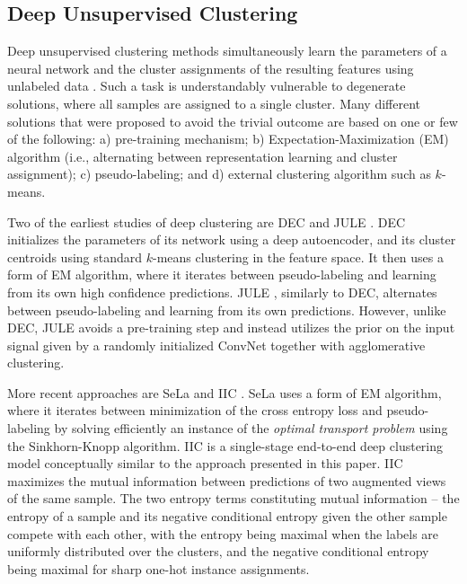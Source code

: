 \documentclass[runningheads]{llncs}
\begin{document}
\subsection{Deep Unsupervised Clustering}
\label{section:deep_unsupervised_clustering}
Deep unsupervised clustering methods simultaneously learn the parameters of a neural network and the cluster assignments of the resulting features using unlabeled data \cite{xie2016unsupervised,yang2016joint,chang2017deep,caron2018deep,haeusser2018associative,ji2019invariant,van2020scan,YM.2020Self-labelling}. Such a task is understandably vulnerable to degenerate solutions, where all samples are assigned to a single cluster. Many different solutions that were proposed to avoid the trivial outcome are based on one or few of the following: a) pre-training mechanism; b) Expectation-Maximization (EM) algorithm (i.e., alternating between representation learning and cluster assignment); c) pseudo-labeling; and d) external clustering algorithm such as $k$-means. 

Two of the earliest studies of deep clustering are DEC \cite{xie2016unsupervised} and JULE \cite{yang2016joint}. DEC \cite{xie2016unsupervised} initializes the parameters of its network using a deep autoencoder, and its cluster centroids using standard $k$-means clustering in the feature space. It then uses a form of EM algorithm, where it iterates between pseudo-labeling and learning from its own high confidence predictions. JULE \cite{xie2016unsupervised}, similarly to DEC, alternates between pseudo-labeling and learning from its own predictions. However, unlike DEC, JULE avoids a pre-training step and instead utilizes the prior on the input signal given by a randomly initialized ConvNet together with agglomerative clustering.

More recent approaches are SeLa \cite{YM.2020Self-labelling} and IIC \cite{ji2019invariant}. SeLa \cite{YM.2020Self-labelling} uses a form of EM algorithm, where it iterates between minimization of the cross entropy loss and pseudo-labeling by solving efficiently an instance of the {\it optimal transport problem} using the Sinkhorn-Knopp algorithm. IIC \cite{ji2019invariant} is a single-stage end-to-end deep clustering model conceptually similar to the approach presented in this paper. IIC maximizes the mutual information between predictions of two augmented views of the same sample. The two entropy terms constituting mutual information -- the entropy of a sample and its negative conditional entropy given the other sample compete with each other, with the entropy being maximal when the labels are uniformly distributed over the clusters, and the negative conditional entropy being maximal for sharp one-hot instance assignments. 
\end{document}
